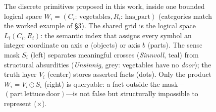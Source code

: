 \begin{figure}[t]
\caption{The discrete primitives proposed in this work, inside one bounded logical space $W_i=(C_i{:}\,\mathrm{vegetables},R_i{:}\,\mathrm{has\_part})$ (categories match the worked example of \S3). The shared grid is the logical space $L_i(C_i,R_i)$: the semantic index that assigns every symbol an integer coordinate on axis $a$ (objects) or axis $b$ (parts). The sense mask $S_i$ (left) separates meaningful crosses (\emph{Sinnvoll}, teal) from structural absurdities (\emph{Unsinnig}, grey: vegetables have no \emph{door}); the truth layer $V_i$ (center) stores asserted facts (dots). Only the product $W_i=V_i\odot S_i$ (right) is queryable: a fact outside the mask---$(\mathrm{part}\ \mathrm{lettuce}\ \mathrm{door})$---is not false but structurally impossible to represent ($\times$).}
\label{fig:layers}
\end{figure}

